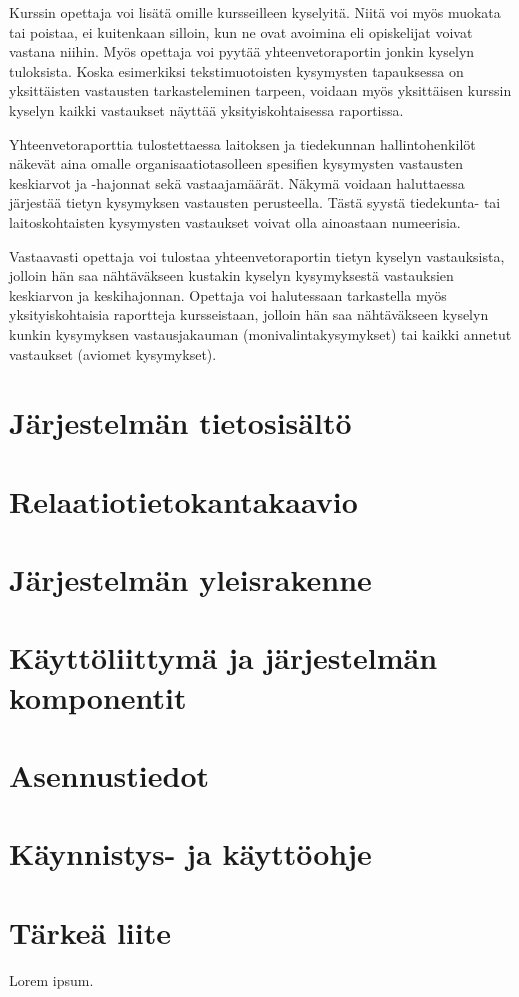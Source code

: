 \documentclass[12pt,a4paper,titlepage]{article}
\begin{document}
Kurssin opettaja voi lisätä omille kursseilleen kyselyitä. Niitä voi myös muokata tai poistaa, ei kuitenkaan silloin, kun ne ovat avoimina eli opiskelijat voivat vastana niihin. Myös opettaja voi pyytää yhteenvetoraportin jonkin kyselyn tuloksista. Koska esimerkiksi tekstimuotoisten kysymysten tapauksessa on yksittäisten vastausten tarkasteleminen tarpeen, voidaan myös yksittäisen kurssin kyselyn kaikki vastaukset näyttää yksityiskohtaisessa raportissa.

Yhteenvetoraporttia tulostettaessa laitoksen ja tiedekunnan hallintohenkilöt näkevät aina omalle organisaatiotasolleen spesifien kysymysten vastausten keskiarvot ja -hajonnat sekä vastaajamäärät. Näkymä voidaan haluttaessa järjestää tietyn kysymyksen vastausten perusteella. Tästä syystä tiedekunta- tai laitoskohtaisten kysymysten vastaukset voivat olla ainoastaan numeerisia.

Vastaavasti opettaja voi tulostaa yhteenvetoraportin tietyn kyselyn vastauksista, jolloin hän saa nähtäväkseen kustakin kyselyn kysymyksestä vastauksien keskiarvon ja keskihajonnan. Opettaja voi halutessaan tarkastella myös yksityiskohtaisia raportteja kursseistaan, jolloin hän saa nähtäväkseen kyselyn kunkin kysymyksen vastausjakauman (monivalintakysymykset) tai kaikki annetut vastaukset (aviomet kysymykset).

\section{Järjestelmän tietosisältö}

\section{Relaatiotietokantakaavio}

\section{Järjestelmän yleisrakenne}

\section{Käyttöliittymä ja järjestelmän komponentit}

\section{Asennustiedot}

\section{Käynnistys- ja käyttöohje}




\small


\appendix
\section{Tärkeä liite}
Lorem ipsum.
\newpage
\end{document}
